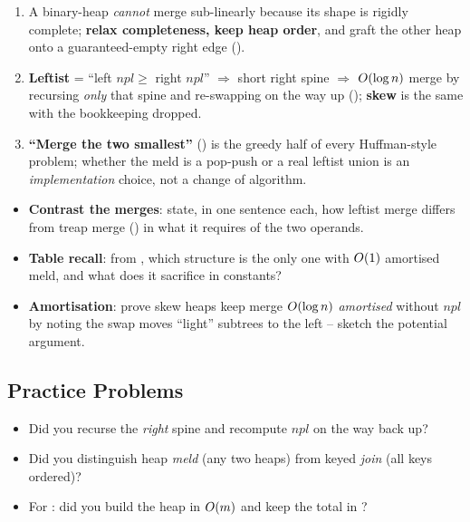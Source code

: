 \begin{insightbox}
\begin{enumerate}[nosep, leftmargin=1.6em]
  \item A binary-heap \emph{cannot} merge sub-linearly because its shape is rigidly complete; \textbf{relax
        completeness, keep heap order}, and graft the other heap onto a guaranteed-empty right edge
        ().
  \item \textbf{Leftist} = ``left $\mathit{npl}\ge$ right $\mathit{npl}$'' $\Rightarrow$ short right spine
        $\Rightarrow$ $O(\log n)$ merge by recursing \emph{only} that spine and re-swapping on the way up
        (); \textbf{skew} is the same with the bookkeeping dropped.
  \item \textbf{``Merge the two smallest''} () is the greedy half of every Huffman-style
        problem; whether the meld is a  pop-push or a real leftist union is an
        \emph{implementation} choice, not a change of algorithm.
\end{enumerate}
\end{insightbox}

\begin{hardeningbox}
\begin{itemize}[nosep, leftmargin=1.4em]
  \item \textbf{Contrast the merges}: state, in one sentence each, how leftist  merge
        differs from treap merge () in what it requires of the two operands.
  \item \textbf{Table recall}: from , which structure is the only one with
        $O(1)$ amortised meld, and what does it sacrifice in constants?
  \item \textbf{Amortisation}: prove skew heaps keep merge $O(\log n)$ \emph{amortised} without $\mathit{npl}$
        by noting the swap moves ``light'' subtrees to the left -- sketch the potential argument.
\end{itemize}
\end{hardeningbox}

\subsection{Practice Problems}

\begin{stuckbox}
\begin{itemize}[nosep, leftmargin=1.4em]
  \item Did you recurse the \emph{right} spine and recompute $\mathit{npl}$ on the way back up?
  \item Did you distinguish heap \emph{meld} (any two heaps) from keyed \emph{join} (all keys ordered)?
  \item For : did you build the heap in $O(m)$ and keep the total in ?
\end{itemize}
\end{stuckbox}

